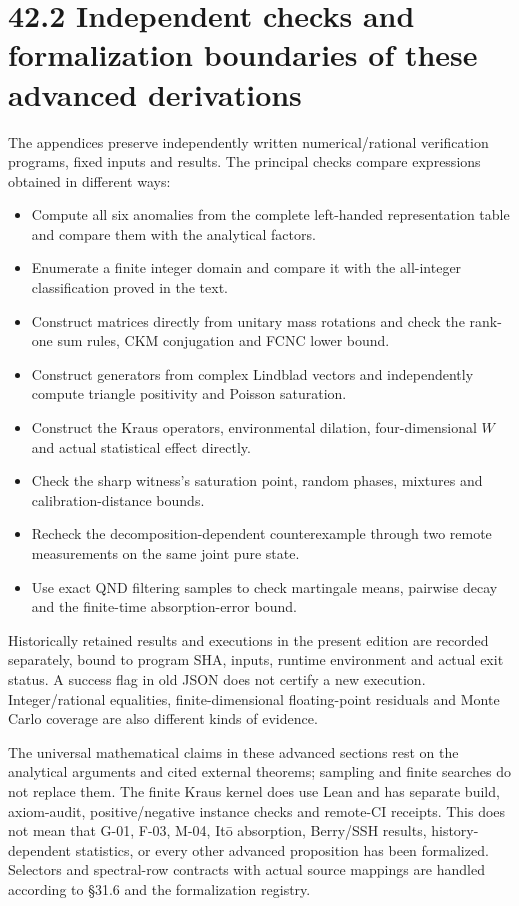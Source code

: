 \documentclass[
  11pt,
  oneside]{book}
\providecommand{\tightlist}{%
  \setlength{\itemsep}{0pt}\setlength{\parskip}{0pt}}
\begin{document}
\section{42.2 Independent checks and formalization boundaries of these
advanced derivations}

The appendices preserve independently written numerical/rational
verification programs, fixed inputs and results. The principal checks
compare expressions obtained in different ways:

\begin{itemize}
\tightlist
\item
  Compute all six anomalies from the complete left-handed representation
  table and compare them with the analytical factors.
\item
  Enumerate a finite integer domain and compare it with the all-integer
  classification proved in the text.
\item
  Construct matrices directly from unitary mass rotations and check the
  rank-one sum rules, CKM conjugation and FCNC lower bound.
\item
  Construct generators from complex Lindblad vectors and independently
  compute triangle positivity and Poisson saturation.
\item
  Construct the Kraus operators, environmental dilation,
  four-dimensional \(W\) and actual statistical effect directly.
\item
  Check the sharp witness's saturation point, random phases, mixtures
  and calibration-distance bounds.
\item
  Recheck the decomposition-dependent counterexample through two remote
  measurements on the same joint pure state.
\item
  Use exact QND filtering samples to check martingale means, pairwise
  decay and the finite-time absorption-error bound.
\end{itemize}

Historically retained results and executions in the present edition are
recorded separately, bound to program SHA, inputs, runtime environment
and actual exit status. A success flag in old JSON does not certify a
new execution. Integer/rational equalities, finite-dimensional
floating-point residuals and Monte Carlo coverage are also different
kinds of evidence.

The universal mathematical claims in these advanced sections rest on the
analytical arguments and cited external theorems; sampling and finite
searches do not replace them. The finite Kraus kernel does use Lean and
has separate build, axiom-audit, positive/negative instance checks and
remote-CI receipts. This does not mean that G-01, F-03, M-04, Itō
absorption, Berry/SSH results, history-dependent statistics, or every
other advanced proposition has been formalized. Selectors and
spectral-row contracts with actual source mappings are handled according
to §31.6 and the formalization registry.
\end{document}
